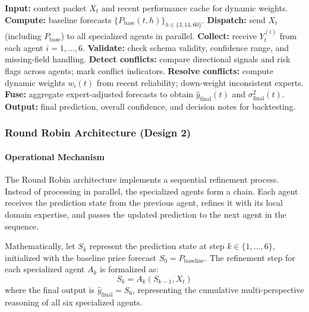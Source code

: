 \documentclass{ieeeaccess}
\begin{document}
    \begin{breakablealgorithm}
    \caption{Master Agent aggregation}
    \begin{algorithmic}[1]
    \STATE \textbf{Input:} context packet $X_t$ and recent performance cache for dynamic weights.
    \STATE \textbf{Compute:} baseline forecasts $\{P_{\text{base}}(t,h)\}_{h\in\{3,14,60\}}$.
    \STATE \textbf{Dispatch:} send $X_t$ (including $P_{\text{base}}$) to all specialized agents in parallel.
    \STATE \textbf{Collect:} receive $Y_t^{(i)}$ from each agent $i=1,\dots,6$.
    \STATE \textbf{Validate:} check schema validity, confidence range, and missing-field handling.
    \STATE \textbf{Detect conflicts:}
      \STATE \hspace{0.8em}compare directional signals and risk flags across agents; mark conflict indicators.
    \STATE \textbf{Resolve conflicts:}
      \STATE \hspace{0.8em}compute dynamic weights $w_i(t)$ from recent reliability; down-weight inconsistent experts.
    \STATE \textbf{Fuse:} aggregate expert-adjusted forecasts to obtain $\hat y_{\text{final}}(t)$ and $\sigma^2_{\text{final}}(t)$.
    \STATE \textbf{Output:} final prediction, overall confidence, and decision notes for backtesting.
    \end{algorithmic}
    \end{breakablealgorithm}

\subsubsection{Round Robin Architecture (Design 2)}
\paragraph{Operational Mechanism}
The Round Robin architecture implements a sequential refinement process. Instead of processing in parallel, the specialized agents form a chain. Each agent receives the prediction state from the previous agent, refines it with its local domain expertise, and passes the updated prediction to the next agent in the sequence.

Mathematically, let $S_k$ represent the prediction state at step $k \in \{1,\dots,6\}$, initialized with the baseline price forecast $S_0 = P_{\text{baseline}}$. The refinement step for each specialized agent $A_k$ is formalized as:
\begin{equation}
S_k = A_k(S_{k-1}, X_t)
\label{eq:round_robin_state}
\end{equation}
where the final output is $\hat{y}_{\text{final}} = S_6$, representing the cumulative multi-perspective reasoning of all six specialized agents.
\end{document}
